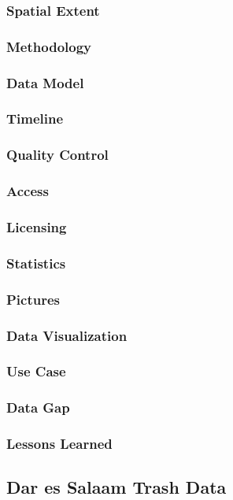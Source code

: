 \documentclass[a4paper,12pt,twoside]{article}
\begin{document}
\subsubsection {Spatial Extent}
\subsubsection{Methodology}
\subsubsection{Data Model}
\subsubsection{Timeline}
\subsubsection{Quality Control}
\subsubsection{Access}
\subsubsection{Licensing}
\subsubsection{Statistics}
\subsubsection{Pictures}
\subsubsection{Data Visualization}
\subsubsection{Use Case}
\subsubsection{Data Gap}
\subsubsection{Lessons Learned}


\newpage
\subsection{Dar es Salaam Trash Data}
\end{document}
